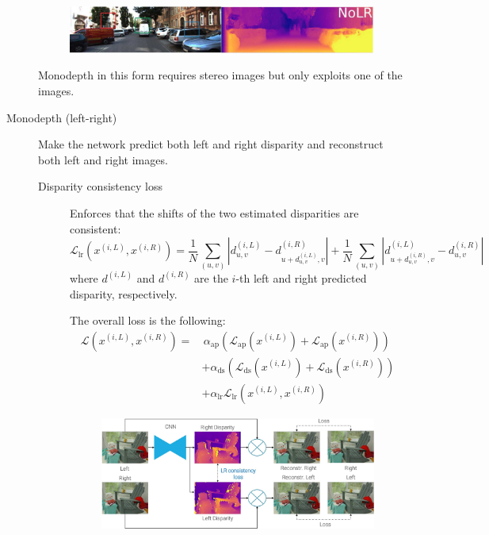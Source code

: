 \begin{description}
\begin{remark}
            \begin{figure}[H]
                \centering
                \includegraphics[width=0.9\linewidth]{./img/monodepth_no_lr_results.jpg}
            \end{figure}
        \end{remark}

        \begin{remark}
            Monodepth in this form requires stereo images but only exploits one of the images.
        \end{remark}


    \item[Monodepth (left-right)] 
        Make the network predict both left and right disparity and reconstruct both left and right images.

        \begin{description}
            \item[Disparity consistency loss] 
                Enforces that the shifts of the two estimated disparities are consistent:
                \[ \mathcal{L}_{\text{lr}}(x^{(i, L)}, x^{(i, R)}) = \frac{1}{N} \sum_{(u, v)} \left| d_{u, v}^{(i, L)} - d^{(i, R)}_{u+d_{u, v}^{(i, L)}, v} \right| + \frac{1}{N} \sum_{(u, v)} \left| d_{u+d_{u, v}^{(i, R)}, v}^{(i, L)} - d^{(i, R)}_{u, v} \right| \]
                where $d^{(i, L)}$ and $d^{(i, R)}$ are the $i$-th left and right predicted disparity, respectively.

                The overall loss is the following:
                \[ 
                    \begin{split}
                        \mathcal{L}(x^{(i, L)}, x^{(i, R)}) = &\,\alpha_\text{ap} \left( \mathcal{L}_\text{ap}(x^{(i, L)}) + \mathcal{L}_\text{ap}(x^{(i, R)}) \right) \\
                            &+ \alpha_\text{ds} \left( \mathcal{L}_\text{ds}(x^{(i, L)}) + \mathcal{L}_\text{ds}(x^{(i, R)}) \right) \\
                            &+ \alpha_\text{lr} \mathcal{L}_\text{lr}(x^{(i, L)}, x^{(i, R)})
                    \end{split}
                \]

                \begin{figure}[H]
                    \centering
                    \includegraphics[width=0.7\linewidth]{./img/_monodepth_lr.jpg}
                \end{figure}


\end{description}
\end{description}
